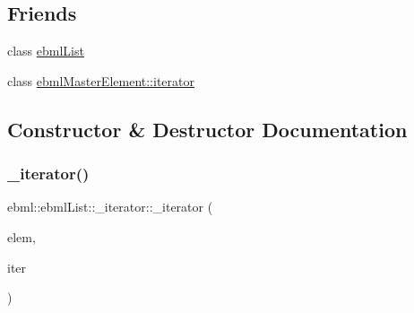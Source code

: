 \subsection*{Friends}
\begin{DoxyCompactItemize}
\item 
class \mbox{\hyperlink{classebml_1_1ebmlList_1_1__iterator_af371b14231393d2eef62cb562cdd6e2d}{ebml\+List}}
\item 
class \mbox{\hyperlink{classebml_1_1ebmlList_1_1__iterator_a7f678a46134f738b99dfff4aafa7fc5f}{ebml\+Master\+Element\+::iterator}}
\end{DoxyCompactItemize}


\subsection{Constructor \& Destructor Documentation}
\mbox{\label{classebml_1_1ebmlList_1_1__iterator_a542711e7adecf301995c4e11e08c0b66}} 
\subsubsection{\texorpdfstring{\+\_\+iterator()}{\_iterator()}\hspace{0.1cm}{\footnotesize\ttfamily [1/2]}}
{\footnotesize\ttfamily ebml\+::ebml\+List\+::\+\_\+iterator\+::\+\_\+iterator (\begin{DoxyParamCaption}\item[{const \mbox{\hyperlink{namespaceebml_adad533b7705a16bb360fe56380c5e7be}{ebml\+Element\+\_\+sp}} \&}]{elem,  }\item[{const std\+::vector$<$ \mbox{\hyperlink{namespaceebml_adad533b7705a16bb360fe56380c5e7be}{ebml\+Element\+\_\+sp}} $>$\+::iterator \&}]{iter }\end{DoxyParamCaption})\hspace{0.3cm}{\ttfamily [protected]}}

\mbox{\label{classebml_1_1ebmlList_1_1__iterator_a5a1d3e19e8cc65dd7e298fb289b6eaa2}} 
